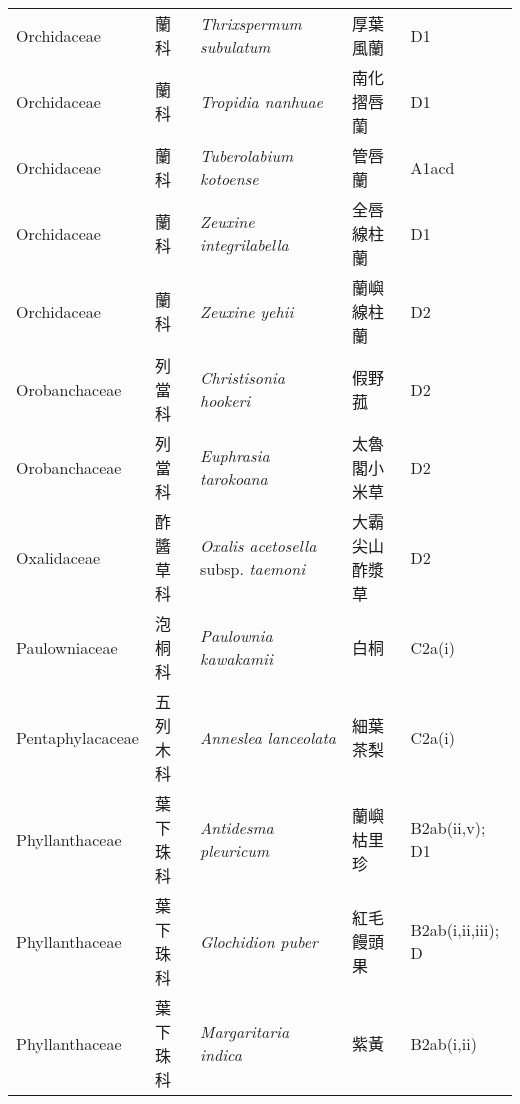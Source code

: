 {\begin{longtable}{p{2.5cm}p{2.5cm}p{4.5cm}p{2.5cm}p{3cm}}
    Orchidaceae & 蘭科 & \textit{Thrixspermum subulatum}  & 厚葉風蘭 & D1 \index{Thrixspermum@\textit{Thrixspermum}!subulatum@\textit{subulatum}}  \index{厚葉風蘭} \\
    Orchidaceae & 蘭科 & \textit{Tropidia nanhuae}  & 南化摺唇蘭 & D1 \index{Tropidia@\textit{Tropidia}!nanhuae@\textit{nanhuae}}  \index{南化摺唇蘭} \\
    Orchidaceae & 蘭科 & \textit{Tuberolabium kotoense}  & 管唇蘭 & A1acd \index{Tuberolabium@\textit{Tuberolabium}!kotoense@\textit{kotoense}}  \index{管唇蘭} \\
    Orchidaceae & 蘭科 & \textit{Zeuxine integrilabella}  & 全唇線柱蘭 & D1 \index{Zeuxine@\textit{Zeuxine}!integrilabella@\textit{integrilabella}}  \index{全唇線柱蘭} \\
    Orchidaceae & 蘭科 & \textit{Zeuxine yehii}  & 蘭嶼線柱蘭 & D2 \index{Zeuxine@\textit{Zeuxine}!yehii@\textit{yehii}}  \index{蘭嶼線柱蘭} \\
    Orobanchaceae & 列當科 & \textit{Christisonia hookeri}  & 假野菰 & D2 \index{Christisonia@\textit{Christisonia}!hookeri@\textit{hookeri}}  \index{假野菰} \\
    Orobanchaceae & 列當科 & \textit{Euphrasia tarokoana}  & 太魯閣小米草 & D2 \index{Euphrasia@\textit{Euphrasia}!tarokoana@\textit{tarokoana}}  \index{太魯閣小米草} \\
    Oxalidaceae & 酢醬草科 & \textit{Oxalis acetosella} subsp. \textit{taemoni}  & 大霸尖山酢漿草 & D2 \index{Oxalis@\textit{Oxalis}!acetosella@\textit{acetosella}!subsp. taemoni@subsp. \textit{taemoni}}  \index{大霸尖山酢漿草} \\
    Paulowniaceae & 泡桐科 & \textit{Paulownia kawakamii}  & 白桐 & C2a(i) \index{Paulownia@\textit{Paulownia}!kawakamii@\textit{kawakamii}}  \index{白桐} \\
    Pentaphylacaceae & 五列木科 & \textit{Anneslea lanceolata}  & 細葉茶梨 & C2a(i) \index{Anneslea@\textit{Anneslea}!lanceolata@\textit{lanceolata}}  \index{細葉茶梨} \\
    Phyllanthaceae & 葉下珠科 & \textit{Antidesma pleuricum}  & 蘭嶼枯里珍 & B2ab(ii,v); D1 \index{Antidesma@\textit{Antidesma}!pleuricum@\textit{pleuricum}}  \index{蘭嶼枯里珍} \\
    Phyllanthaceae & 葉下珠科 & \textit{Glochidion puber}  & 紅毛饅頭果 & B2ab(i,ii,iii); D \index{Glochidion@\textit{Glochidion}!puber@\textit{puber}}  \index{紅毛饅頭果} \\
    Phyllanthaceae & 葉下珠科 & \textit{Margaritaria indica}  & 紫黃 & B2ab(i,ii) \index{Margaritaria@\textit{Margaritaria}!indica@\textit{indica}}  \index{紫黃} \\

\end{longtable}}
